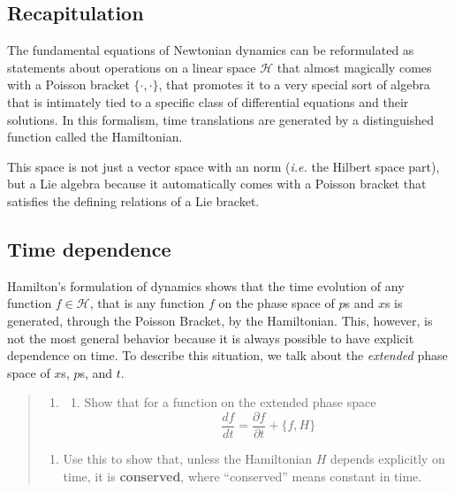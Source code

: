 \documentclass[
  letterpaper,
  DIV=11,
  numbers=noendperiod]{scrartcl}
\providecommand{\tightlist}{%
  \setlength{\itemsep}{0pt}\setlength{\parskip}{0pt}}
\begin{document}
\subsection{Recapitulation}\label{recapitulation}

The fundamental equations of Newtonian dynamics can be reformulated as
statements about operations on a linear space \(\mathscr H\) that almost
magically comes with a Poisson bracket \(\{\cdot, \cdot\}\), that
promotes it to a very special sort of algebra that is intimately tied to
a specific class of differential equations and their solutions. In this
formalism, time translations are generated by a distinguished function
called the Hamiltonian.

This space is not just a vector space with an norm (\emph{i.e.} the
Hilbert space part), but a Lie algebra because it automatically comes
with a Poisson bracket that satisfies the defining relations of a Lie
bracket.

\subsection{Time dependence}\label{time-dependence}

Hamilton's formulation of dynamics shows that the time evolution of any
function \(f\in {\mathscr H}\), that is any function \(f\) on the phase
space of \(p\)s and \(x\)s is generated, through the Poisson Bracket, by
the Hamiltonian. This, however, is not the most general behavior because
it is always possible to have explicit dependence on time. To describe
this situation, we talk about the \emph{extended} phase space of \(x\)s,
\(p\)s, and \(t\).

\begin{quote}
\begin{enumerate}
\def\labelenumi{\arabic{enumi}.}
\setcounter{enumi}{9}
\tightlist
\item
  \begin{enumerate}
  \def\labelenumii{\alph{enumii}.}
  \tightlist
  \item
    Show that for a function on the extended phase space \[
    \frac {df}{dt} = \frac {\partial f}{\partial t} + \{f,H\}
    \]
  \end{enumerate}
\end{enumerate}

\begin{enumerate}
\def\labelenumi{\alph{enumi}.}
\setcounter{enumi}{1}
\tightlist
\item
  Use this to show that, unless the Hamiltonian \(H\) depends explicitly
  on time, it is \textbf{conserved}, where ``conserved'' means constant
  in time.
\end{enumerate}
\end{quote}
\end{document}
